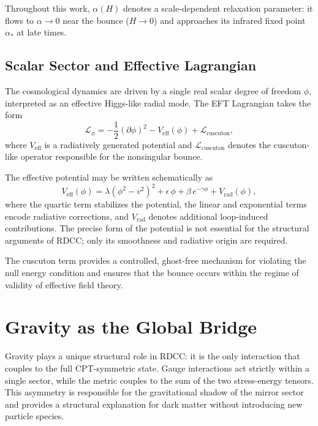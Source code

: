 \documentclass[11pt,a4paper]{article}
\begin{document}
Throughout this work, \(\alpha(H)\) denotes a scale-dependent relaxation
parameter: it flows to \(\alpha \to 0\) near the bounce (\(H \to 0\)) and approaches
its infrared fixed point \(\alpha_{*}\) at late times.


\subsection{Scalar Sector and Effective Lagrangian}

The cosmological dynamics are driven by a single real scalar degree of freedom
\(\phi\), interpreted as an effective Higgs-like radial mode. The EFT Lagrangian
takes the form
\begin{equation}
    \mathcal{L}_{\phi}
        = -\frac{1}{2}(\partial\phi)^{2}
          - V_{\mathrm{eff}}(\phi)
          + \mathcal{L}_{\mathrm{cuscuton}},
\end{equation}
where \(V_{\mathrm{eff}}\) is a radiatively generated potential and
\(\mathcal{L}_{\mathrm{cuscuton}}\) denotes the cuscuton-like operator responsible
for the nonsingular bounce.

The effective potential may be written schematically as
\begin{equation}
    V_{\mathrm{eff}}(\phi)
        = \lambda(\phi^{2} - v^{2})^{2}
          + \epsilon\,\phi
          + \beta\,e^{-\gamma\phi}
          + V_{\mathrm{rad}}(\phi),
\end{equation}
where the quartic term stabilizes the potential, the linear and exponential
terms encode radiative corrections, and \(V_{\mathrm{rad}}\) denotes additional
loop-induced contributions. The precise form of the potential is not essential
for the structural arguments of RDCC; only its smoothness and radiative origin
are required.

The cuscuton term provides a controlled, ghost-free mechanism for violating the
null energy condition and ensures that the bounce occurs within the regime of
validity of effective field theory.

\section{Gravity as the Global Bridge}

Gravity plays a unique structural role in RDCC: it is the only interaction that
couples to the full CPT-symmetric state. Gauge interactions act strictly within
a single sector, while the metric couples to the sum of the two stress-energy
tensors. This asymmetry is responsible for the gravitational shadow of the
mirror sector and provides a structural explanation for dark matter without
introducing new particle species.
\end{document}
